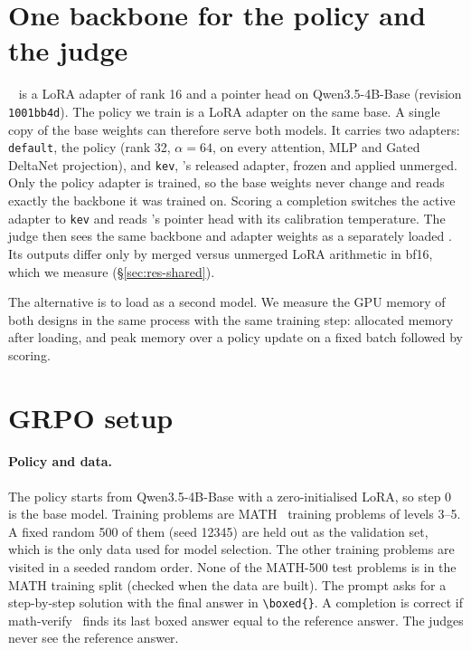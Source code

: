
\section{One backbone for the policy and the judge}\label{sec:shared}

\kev{}~\cite{kev4b} is a LoRA adapter of rank 16 and a pointer head on Qwen3.5-4B-Base (revision \texttt{1001bb4d}).
The policy we train is a LoRA adapter on the same base. A single copy of the base weights can therefore serve both
models. It carries two adapters: \texttt{default}, the policy (rank 32, $\alpha=64$, on every attention, MLP and Gated
DeltaNet projection), and \texttt{kev}, \kev{}'s released adapter, frozen and applied unmerged. Only the policy adapter
is trained, so the base weights never change and \kev{} reads exactly the backbone it was trained on. Scoring a
completion switches the active adapter to \texttt{kev} and reads \kev{}'s pointer head with its calibration temperature.
The judge then sees the same backbone and adapter weights as a separately loaded \kev{}. Its outputs differ only by
merged versus unmerged LoRA arithmetic in bf16, which we measure (\S\ref{sec:res-shared}).

The alternative is to load \kev{} as a second model. We measure the GPU memory of both designs in the same process
with the same training step: allocated memory after loading, and peak memory over a policy update on a fixed batch
followed by \kev{} scoring.

\section{GRPO setup}\label{sec:grpo}

\paragraph{Policy and data.} The policy starts from Qwen3.5-4B-Base with a zero-initialised LoRA, so step 0 is the base
model. Training problems are MATH~\cite{hendrycks2021math} training problems of levels 3--5. A fixed random 500 of them
(seed 12345) are held out as the validation set, which is the only data used for model selection. The other
training problems are visited in a seeded random order. None of the MATH-500 test problems is in the MATH training
split (checked when the data are built). The prompt asks for a step-by-step solution with the final answer in
\verb|\boxed{}|. A completion is correct if math-verify~\cite{mathverify} finds its last boxed answer equal to the
reference answer. The judges never see the reference answer.

